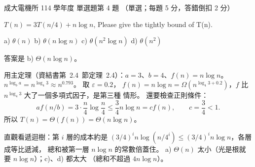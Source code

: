 \begin{pastexam}[label={px:ncku-114-ee-ds-04}]{成大電機所 114 學年度 單選題第 4 題}
（單選；每題 5 分，答錯倒扣 2 分）

$T(n)=3T(n/4)+n\log n$, Please give the tightly bound of T(n).

a) $\theta(n)$ \quad b) $\theta(n\log n)$ \quad c) $\theta(n^2\log n)$ \quad d) $\theta(n^2)$
\end{pastexam}

\begin{pastsoln}
答案是 b) $\Theta(n \log n)$。

用主定理（資結書第~2.4~節定理~2.4）：$a = 3$、$b = 4$、$f(n) = n \log n$。
$n^{\log_b a} = n^{\log_4 3} \approx n^{0.793}$。 取 $\varepsilon = 0.2$，
$f(n) = n \log n = \Omega(n^{\log_4 3 + 0.2})$，$f$ 比 $n^{\log_4 3}$ 大了一個多項式因子，是第三種
情形。 還要檢查正則條件：
\[
a f(n/b) = 3 \cdot \frac{n}{4} \log \frac{n}{4} \le \frac{3}{4} n \log n = c f(n),\qquad c = \frac{3}{4} < 1.
\]
所以 $T(n) = \Theta(f(n)) = \Theta(n \log n)$。

直觀看遞迴樹：第 $i$ 層的成本約是 $(3/4)^i n \log(n/4^i) \le (3/4)^i n \log n$，各層成等比遞減，
總和被第一層 $n \log n$ 的常數倍蓋住。 a) $\Theta(n)$ 太小（光是根就要 $n \log n$）；c)、d) 都太大
（總和不超過 $4 n \log n$）。
\end{pastsoln}
